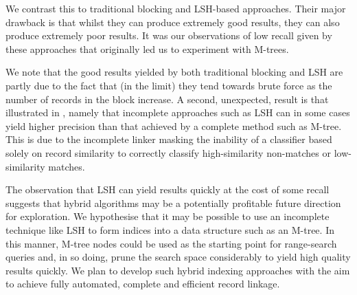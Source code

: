\documentclass{llncs}
\begin{document}
We contrast this to traditional blocking and LSH-based approaches. Their
major drawback is that whilst they can produce extremely good results,
they can also produce extremely poor results. It was our observations of
low recall given by these approaches that originally led us to
experiment with M-trees.

We note that the good results yielded by both traditional blocking and
LSH are partly due to the fact that (in the limit) they tend towards
brute force as the number of records in the block increase. A second,
unexpected, result is that illustrated in
, namely that incomplete approaches
such as LSH can in some cases yield higher precision than that achieved
by a complete method such as M-tree. This is due to the incomplete
linker masking the inability of a classifier based solely on
record similarity to correctly classify high-similarity non-matches or
low-similarity matches.

The observation that LSH can yield results quickly at the cost of some
recall suggests that hybrid algorithms may be a potentially profitable
future direction for exploration. We hypothesise that it may be possible
to use an incomplete technique like LSH to form indices into a data
structure such as an M-tree. In this manner, M-tree nodes could be used
as the starting point for range-search queries and, in so doing, prune
the search space considerably to yield high quality results quickly.
We plan to develop such hybrid indexing approaches with the aim to
achieve fully automated, complete and efficient record linkage.



 

\end{document}
